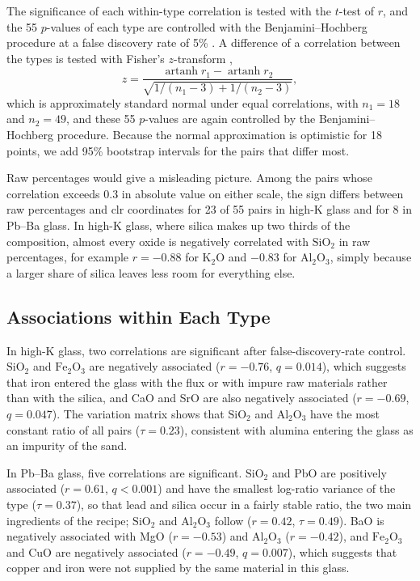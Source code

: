 \documentclass[11pt,a4paper]{article}
\newcommand{\ox}[1]{\ensuremath{\mathrm{#1}}}
\begin{document}
The significance of each within-type correlation is tested with the $t$-test of $r$, and the 55 $p$-values of each type are controlled with the Benjamini--Hochberg procedure at a false discovery rate of 5\% \citep{bh1995}.
A difference of a correlation between the types is tested with Fisher's $z$-transform \citep{fisher1915},
\begin{equation}
z = \frac{\operatorname{artanh} r_1 - \operatorname{artanh} r_2}{\sqrt{1/(n_1-3)+1/(n_2-3)}},
\end{equation}
which is approximately standard normal under equal correlations, with $n_1=18$ and $n_2=49$, and these 55 $p$-values are again controlled by the Benjamini--Hochberg procedure.
Because the normal approximation is optimistic for 18 points, we add 95\% bootstrap intervals for the pairs that differ most.

Raw percentages would give a misleading picture.
Among the pairs whose correlation exceeds 0.3 in absolute value on either scale, the sign differs between raw percentages and clr coordinates for 23 of 55 pairs in high-K glass and for 8 in Pb--Ba glass.
In high-K glass, where silica makes up two thirds of the composition, almost every oxide is negatively correlated with \ox{SiO_2} in raw percentages, for example $r=-0.88$ for \ox{K_2O} and $-0.83$ for \ox{Al_2O_3}, simply because a larger share of silica leaves less room for everything else.

\subsection{Associations within Each Type}
In high-K glass, two correlations are significant after false-discovery-rate control.
\ox{SiO_2} and \ox{Fe_2O_3} are negatively associated ($r=-0.76$, $q=0.014$), which suggests that iron entered the glass with the flux or with impure raw materials rather than with the silica, and CaO and SrO are also negatively associated ($r=-0.69$, $q=0.047$).
The variation matrix shows that \ox{SiO_2} and \ox{Al_2O_3} have the most constant ratio of all pairs ($\tau=0.23$), consistent with alumina entering the glass as an impurity of the sand.

In Pb--Ba glass, five correlations are significant.
\ox{SiO_2} and PbO are positively associated ($r=0.61$, $q<0.001$) and have the smallest log-ratio variance of the type ($\tau=0.37$), so that lead and silica occur in a fairly stable ratio, the two main ingredients of the recipe; \ox{SiO_2} and \ox{Al_2O_3} follow ($r=0.42$, $\tau=0.49$).
BaO is negatively associated with MgO ($r=-0.53$) and \ox{Al_2O_3} ($r=-0.42$), and \ox{Fe_2O_3} and CuO are negatively associated ($r=-0.49$, $q=0.007$), which suggests that copper and iron were not supplied by the same material in this glass.
\end{document}

